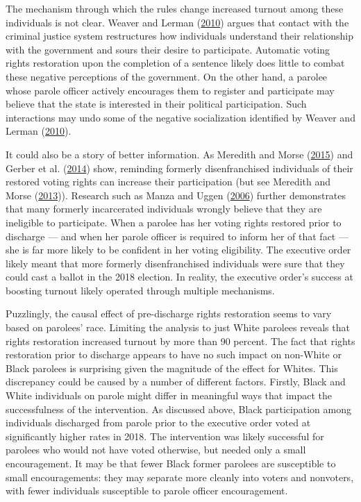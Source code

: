\documentclass[12pt,]{article}
\begin{document}
The mechanism through which the rules change increased turnout among these individuals is not clear. Weaver and Lerman (\protect\hyperlink{ref-Weaver2010}{2010}) argues that contact with the criminal justice system restructures how individuals understand their relationship with the government and sours their desire to participate. Automatic voting rights restoration upon the completion of a sentence likely does little to combat these negative perceptions of the government. On the other hand, a parolee whose parole officer actively encourages them to register and participate may believe that the state is interested in their political participation. Such interactions may undo some of the negative socialization identified by Weaver and Lerman (\protect\hyperlink{ref-Weaver2010}{2010}).

It could also be a story of better information. As Meredith and Morse (\protect\hyperlink{ref-Meredith2015}{2015}) and Gerber et al. (\protect\hyperlink{ref-Gerber2014}{2014}) show, reminding formerly disenfranchised individuals of their restored voting rights can increase their participation (but see Meredith and Morse (\protect\hyperlink{ref-Meredith2013}{2013})). Research such as Manza and Uggen (\protect\hyperlink{ref-locked_out}{2006}) further demonstrates that many formerly incarcerated individuals wrongly believe that they are ineligible to participate. When a parolee has her voting rights restored prior to discharge --- and when her parole officer is required to inform her of that fact --- she is far more likely to be confident in her voting eligibility. The executive order likely meant that more formerly disenfranchised individuals were sure that they could cast a ballot in the 2018 election. In reality, the executive order's success at boosting turnout likely operated through multiple mechanisms.

Puzzlingly, the causal effect of pre-discharge rights restoration seems to vary based on parolees' race. Limiting the analysis to just White parolees reveals that rights restoration increased turnout by more than 90 percent. The fact that rights restoration prior to discharge appears to have no such impact on non-White or Black parolees is surprising given the magnitude of the effect for Whites. This discrepancy could be caused by a number of different factors. Firstly, Black and White individuals on parole might differ in meaningful ways that impact the successfulness of the intervention. As discussed above, Black participation among individuals discharged from parole prior to the executive order voted at significantly higher rates in 2018. The intervention was likely successful for parolees who would not have voted otherwise, but needed only a small encouragement. It may be that fewer Black former parolees are susceptible to small encouragements: they may separate more cleanly into voters and nonvoters, with fewer individuals susceptible to parole officer encouragement.
\end{document}

